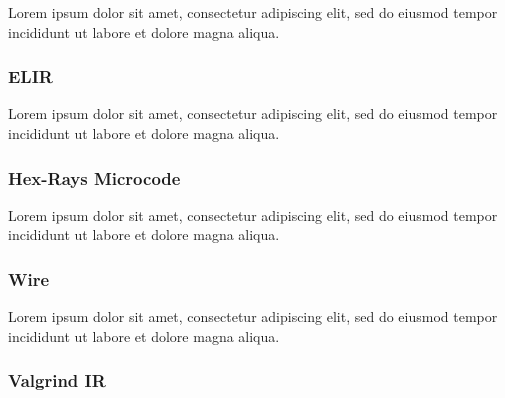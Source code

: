 \documentclass[12pt, a4paper]{article}
\begin{document}


Lorem ipsum dolor sit amet, consectetur adipiscing elit, sed do eiusmod tempor incididunt ut labore et dolore magna aliqua.


\subsubsection{ELIR}


Lorem ipsum dolor sit amet, consectetur adipiscing elit, sed do eiusmod tempor incididunt ut labore et dolore magna aliqua.


\subsubsection{Hex-Rays Microcode}

Lorem ipsum dolor sit amet, consectetur adipiscing elit, sed do eiusmod tempor incididunt ut labore et dolore magna aliqua.

\cite{hexrays}


\subsubsection{Wire}


Lorem ipsum dolor sit amet, consectetur adipiscing elit, sed do eiusmod tempor incididunt ut labore et dolore magna aliqua.



\subsubsection{Valgrind IR}
\end{document}

